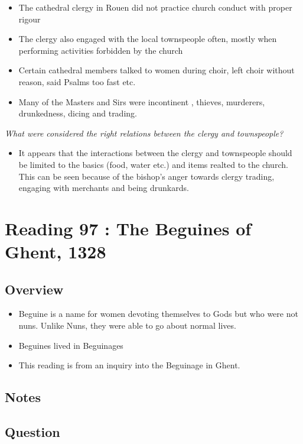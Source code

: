 \documentclass[12pt]{article}
\begin{document}
\begin{itemize}
	\item The cathedral clergy in Rouen did not practice church conduct with proper rigour
	\item The clergy also engaged with the local townspeople often, mostly when performing activities forbidden by the church
	\item Certain cathedral members talked to women during choir, left choir without reason, said Psalms too fast etc.
	\item Many of the Masters and Sirs were incontinent , thieves, murderers, drunkedness, dicing and trading. 
\end{itemize}

\textit{What were considered the right relations between the clergy and townspeople?}
\begin{itemize}
	\item It appears that the interactions between the clergy and townspeople should be limited to the basics (food, water etc.) and items realted to the church. This can be seen because of the bishop's anger towards clergy trading, engaging with merchants and being drunkards.
\end{itemize}

\section*{Reading 97 : The Beguines of Ghent, 1328}

\subsection*{Overview}
\begin{itemize}
	\item Beguine is a name for women devoting themselves to Gods but who were not nuns. Unlike Nuns, they were able to go about normal lives.
	\item Beguines lived in Beguinages
	\item This reading is from an inquiry into the Beguinage in Ghent.
\end{itemize}

\subsection*{Notes}

\subsection*{Question}
\end{document}
